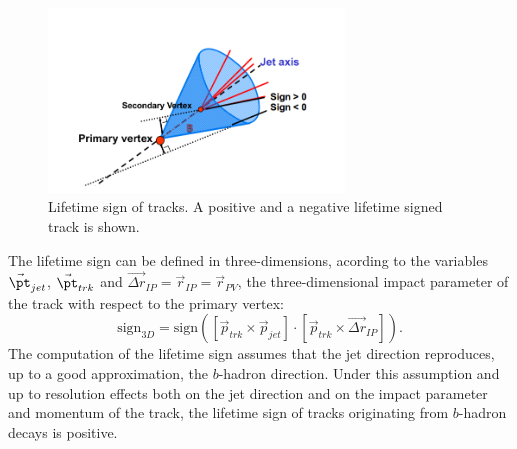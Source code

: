 \begin{figure}[htbp]
  \begin{center}
      \includegraphics[width=0.7\textwidth]{signedFinal.png}
    \caption{Lifetime sign of tracks. A positive and a negative lifetime signed track is shown.}
    \label{fig:signedIP}
  \end{center}
\end{figure}

The lifetime sign can be defined in three-dimensions, acording to the variables $\vec{\pt}_{jet}$, $\vec{\pt}_{trk}$ and $\vec{\Delta r}_{IP} = \vec{r}_{IP} = \vec{r}_{PV}$, the three-dimensional impact parameter of the track with respect to the primary vertex:
%
\begin{equation}
\mbox{sign}_{3D} = \mbox{sign}([\vec{p}_{trk} \times \vec{p}_{jet}]\cdot[\vec{p}_{trk} \times \vec{\Delta r}_{IP} ]).
\end{equation}
%
The computation of the lifetime sign assumes that the jet direction reproduces, up to a good approximation, the $b$-hadron direction. Under this assumption and up to resolution effects both on the jet direction and on the impact parameter and momentum of the track, the lifetime sign of tracks originating from $b$-hadron decays is positive.

